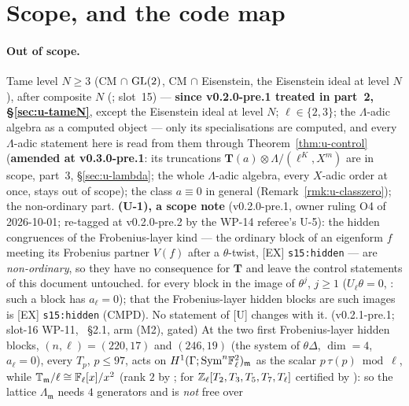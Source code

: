 \documentclass[11pt]{article}
\newcommand{\Iw}{\Lambda}                         %
\newcommand{\Tu}{\mathbf{T}}                      %
\begin{document}
\section{Scope, and the code map}\label{sec:u-scope}

\paragraph{Out of scope.} Tame level $N\ge3$ (CM $\cap$ $\mathrm{GL}(2)$, CM $\cap$ Eisenstein, the Eisenstein ideal at level $N$), after composite $N$ (; slot~15)
--- \textbf{since v0.2.0-pre.1 treated in part~2, \S\ref{sec:u-tameN}}, except the Eisenstein ideal at level $N$;
$\ell\in\{2,3\}$; the $\Iw$-adic algebra as a computed object --- only its specialisations are computed, and every $\Iw$-adic statement here is read from them through
Theorem~\ref{thm:u-control} (\textbf{amended at v0.3.0-pre.1}: its truncations $\Tu(a)\otimes\Iw/(\ell^{K},X^{m})$ are in scope, part~3, \S\ref{sec:u-lambda}; the whole
$\Iw$-adic algebra, every $X$-adic order at once, stays out of scope); the class $a\equiv0$ in general (Remark~\ref{rmk:u-classzero}); the non-ordinary part.
\textbf{(U-1), a scope note} (v0.2.0-pre.1, owner ruling O4 of 2026-10-01; re-tagged at v0.2.0-pre.2 by the WP-14 referee's U-5): the hidden congruences of the
Frobenius-layer kind --- the ordinary block of an eigenform $f$ meeting its Frobenius partner $V(f)$ after a $\theta$-twist, [EX] \texttt{s15:hidden} --- are
\emph{non-ordinary}, so they have no consequence for $\Tu$ and leave the control statements of this document untouched. \PROVED{} for every block in the image of
$\theta^{j}$, $j\ge1$ ($U_\ell\theta=0$, : such a block has $a_\ell=0$); that the Frobenius-layer hidden blocks are such images is [EX]
\texttt{s15:hidden} (\textsf{CMPD}). No statement of [U] changes with it.
\COMP{} (v0.2.1-pre.1; slot-16 WP-11, ~\S2.1,  arm (M2), gated) At the
two first Frobenius-layer hidden blocks, $(n,\ell)=(220,17)$ and $(246,19)$ (the system of $\theta\Delta$, $\dim=4$, $a_\ell=0$), every $T_p$, $p\le97$, acts on
$H^{1}(\Gamma;\mathrm{Sym}^{n}\mathbb{F}_\ell^{2})_{\mathfrak m}$ as the scalar $p\,\tau(p)\bmod\ell$, while $\mathbb{T}_{\mathfrak m}/\ell\cong\mathbb{F}_\ell[x]/x^{2}$ (rank $2$ by ; for
$\mathbb{Z}_\ell[T_2,T_3,T_5,T_7,T_\ell]$ certified by ): so the lattice $\Lambda_{\mathfrak m}$ needs $4$ generators and is \emph{not} free over
\end{document}
